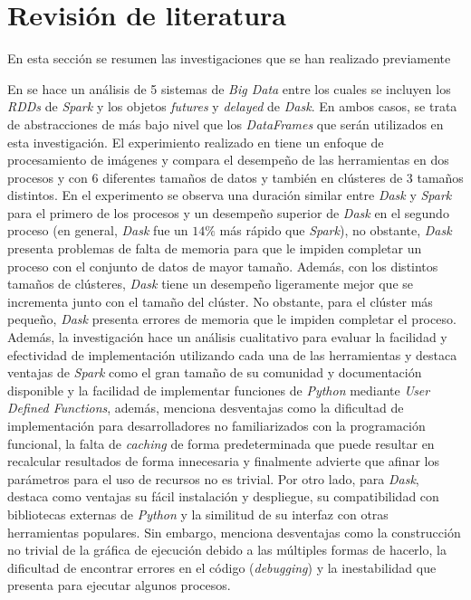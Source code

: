 \chapter{Revisión de literatura}

\noindent En esta sección se resumen las investigaciones que se han realizado previamente  

En \cite{comparative-evolution} se hace un análisis de 5 sistemas de \textit{Big Data} entre los cuales se incluyen los \textit{RDDs} de \textit{Spark} y los objetos \textit{futures} y \textit{delayed} de \textit{Dask}. En ambos casos, se trata de abstracciones de más bajo nivel que los \textit{DataFrames} que serán utilizados en esta investigación. El experimiento realizado en \cite{comparative-evolution} tiene un enfoque de procesamiento de imágenes y compara el desempeño de las herramientas en dos procesos y con 6 diferentes tamaños de datos y también en clústeres de 3 tamaños distintos. En el experimento se observa una duración similar entre \textit{Dask} y \textit{Spark} para el primero de los procesos y un desempeño superior de \textit{Dask} en el segundo proceso (en general, \textit{Dask} fue un $14\%$ más rápido que \textit{Spark}), no obstante, \textit{Dask} presenta problemas de falta de memoria para que le impiden completar un proceso con el conjunto de datos de mayor tamaño. Además, con los distintos tamaños de clústeres, \textit{Dask} tiene un desempeño ligeramente mejor que se incrementa junto con el tamaño del clúster. No obstante, para el clúster más pequeño, \textit{Dask} presenta errores de memoria que le impiden completar el proceso. Además, la investigación hace un análisis cualitativo para evaluar la facilidad y efectividad de implementación utilizando cada una de las herramientas y destaca ventajas de \textit{Spark} como el gran tamaño de su comunidad y documentación disponible y la facilidad de implementar funciones de \textit{Python} mediante \textit{User Defined Functions}, además, menciona desventajas como la dificultad de implementación para desarrolladores no familiarizados con la programación funcional, la falta de \textit{caching} de forma predeterminada que puede resultar en recalcular resultados de forma innecesaria y finalmente advierte que afinar los parámetros para el uso de recursos no es trivial. Por otro lado, para \textit{Dask}, destaca como ventajas su fácil instalación y despliegue, su compatibilidad con bibliotecas externas de \textit{Python} y la similitud de su interfaz con otras herramientas populares. Sin embargo, menciona desventajas como la construcción no trivial de la gráfica de ejecución debido a las múltiples formas de hacerlo, la dificultad de encontrar errores en el código (\textit{debugging}) y la inestabilidad que presenta para ejecutar algunos procesos.

